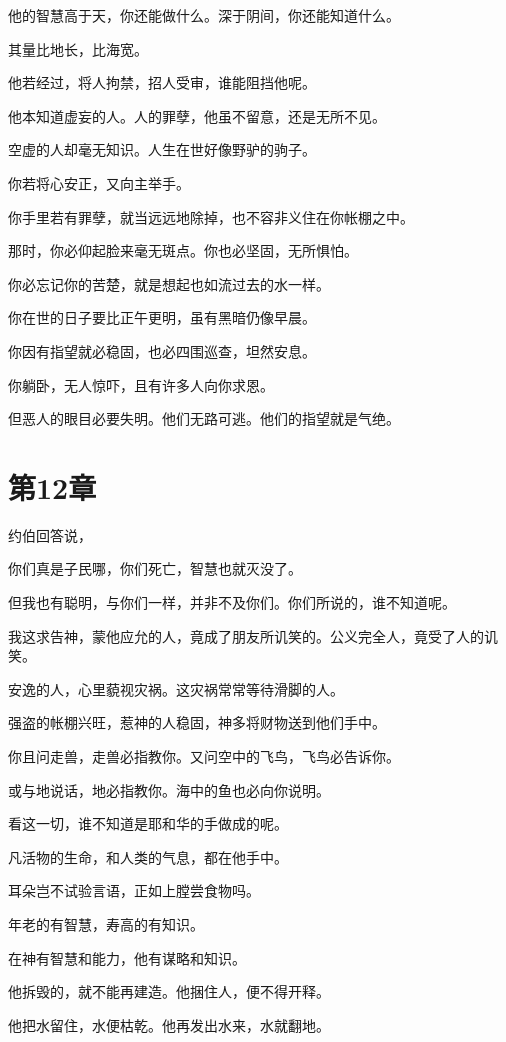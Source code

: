 \documentclass[12pt,oneside]{book}
\begin{document}
他的智慧高于天，你还能做什么。深于阴间，你还能知道什么。

其量比地长，比海宽。

他若经过，将人拘禁，招人受审，谁能阻挡他呢。

他本知道虚妄的人。人的罪孽，他虽不留意，还是无所不见。

空虚的人却毫无知识。人生在世好像野驴的驹子。

你若将心安正，又向主举手。

你手里若有罪孽，就当远远地除掉，也不容非义住在你帐棚之中。

那时，你必仰起脸来毫无斑点。你也必坚固，无所惧怕。

你必忘记你的苦楚，就是想起也如流过去的水一样。

你在世的日子要比正午更明，虽有黑暗仍像早晨。

你因有指望就必稳固，也必四围巡查，坦然安息。

你躺卧，无人惊吓，且有许多人向你求恩。

但恶人的眼目必要失明。他们无路可逃。他们的指望就是气绝。



\chapter{第12章}
约伯回答说，

你们真是子民哪，你们死亡，智慧也就灭没了。

但我也有聪明，与你们一样，并非不及你们。你们所说的，谁不知道呢。

我这求告神，蒙他应允的人，竟成了朋友所讥笑的。公义完全人，竟受了人的讥笑。

安逸的人，心里藐视灾祸。这灾祸常常等待滑脚的人。

强盗的帐棚兴旺，惹神的人稳固，神多将财物送到他们手中。

你且问走兽，走兽必指教你。又问空中的飞鸟，飞鸟必告诉你。

或与地说话，地必指教你。海中的鱼也必向你说明。

看这一切，谁不知道是耶和华的手做成的呢。

凡活物的生命，和人类的气息，都在他手中。

耳朵岂不试验言语，正如上膛尝食物吗。

年老的有智慧，寿高的有知识。

在神有智慧和能力，他有谋略和知识。

他拆毁的，就不能再建造。他捆住人，便不得开释。

他把水留住，水便枯乾。他再发出水来，水就翻地。
\end{document}
